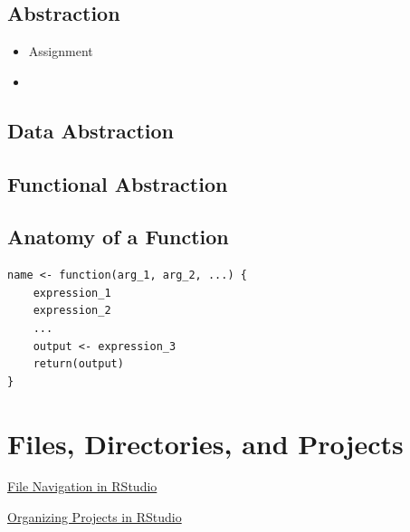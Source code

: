 \documentclass[
]{book}
\providecommand{\tightlist}{%
  \setlength{\itemsep}{0pt}\setlength{\parskip}{0pt}}
\begin{document}
\hypertarget{abstraction}{%
\section{Abstraction}\label{abstraction}}

\begin{itemize}
\tightlist
\item
  Assignment
\item
\end{itemize}

\hypertarget{data-abstraction}{%
\section{Data Abstraction}\label{data-abstraction}}

\hypertarget{functional-abstraction}{%
\section{Functional Abstraction}\label{functional-abstraction}}

\hypertarget{anatomy-of-a-function}{%
\section{Anatomy of a Function}\label{anatomy-of-a-function}}

\begin{verbatim}
name <- function(arg_1, arg_2, ...) {
    expression_1
    expression_2
    ...
    output <- expression_3
    return(output)
}
\end{verbatim}

\hypertarget{files-directories-and-projects}{%
\chapter{Files, Directories, and Projects}\label{files-directories-and-projects}}

\href{https://auburn.hosted.panopto.com/Panopto/Pages/Viewer.aspx?id=48773598-f6ba-4771-8515-ad880135ee36}{File Navigation in RStudio}

\href{https://auburn.hosted.panopto.com/Panopto/Pages/Viewer.aspx?id=aed0e2a9-004f-453f-80c7-abbe010a063b}{Organizing Projects in RStudio}

  
\end{document}
